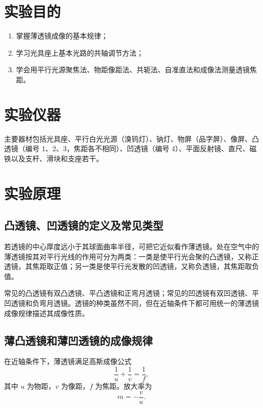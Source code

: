 \documentclass{../template/myrpt}
\begin{document}
\maketitle

\section{实验目的}
\begin{enumerate}[label=\arabic*. ]
  \item 掌握薄透镜成像的基本规律；
  \item 学习光具座上基本光路的共轴调节方法；
  \item 学会用平行光源聚焦法、物距像距法、共轭法、自准直法和成像法测量透镜焦距。
\end{enumerate}

\section{实验仪器}

主要器材包括光具座、平行白光光源（溴钨灯）、钠灯、物屏（品字屏）、像屏、凸透镜（编号 1、2、3，焦距各不相同）、凹透镜（编号 4）、平面反射镜、直尺、磁铁以及支杆、滑块和支座若干。

\section{实验原理}

\subsection{凸透镜、凹透镜的定义及常见类型}

若透镜的中心厚度远小于其球面曲率半径，可把它近似看作薄透镜。处在空气中的薄透镜按其对平行光线的作用可分为两类：一类是使平行光会聚的凸透镜，又称正透镜，其焦距取正值；另一类是使平行光发散的凹透镜，又称负透镜，其焦距取负值。

常见的凸透镜有双凸透镜、平凸透镜和正弯月透镜；常见的凹透镜有双凹透镜、平凹透镜和负弯月透镜。透镜的种类虽然不同，但在近轴条件下都可用统一的薄透镜成像规律描述其成像性质。

\subsection{薄凸透镜和薄凹透镜的成像规律}

在近轴条件下，薄透镜满足高斯成像公式
\[
  \frac{1}{u} + \frac{1}{v} = \frac{1}{f},
\]
其中 $u$ 为物距，$v$ 为像距，$f$ 为焦距。放大率为
\[
  m = -\frac{v}{u}.
\]
\end{document}
